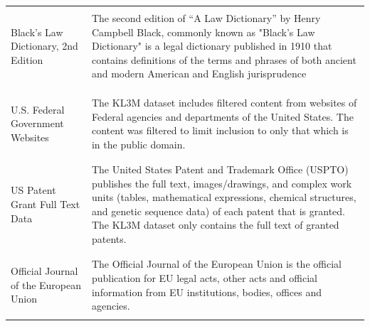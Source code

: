 \documentclass{article}
\begin{document}
\begin{appendices}
\begin{table}[!ht]
\begin{longtable}{ p{3cm} p{9cm} }
\\
 \\\hline
  \\
Black's Law Dictionary, 2nd Edition &
The second edition of ``A Law Dictionary'' by Henry Campbell Black, commonly known as "Black's Law Dictionary" is a legal dictionary published in 1910 that contains definitions of the terms and phrases of both ancient and modern American and English jurisprudence \\\\
 \\\hline  \\
U.S. Federal Government Websites &
The KL3M dataset includes filtered content from websites of Federal agencies and departments of the United States. The content was filtered to limit inclusion to only that which is in the public domain.  \\
 \\\hline
 \\
US Patent Grant Full Text Data &
The United States Patent and Trademark Office (USPTO) publishes the full text, images/drawings, and complex work units (tables, mathematical expressions, chemical structures, and genetic sequence data) of each patent that is granted. The KL3M dataset only contains the full text of granted patents.
  \\
 \\\hline 
 \\
 Official Journal of the European Union &
The Official Journal of the European Union is the official publication for EU legal acts, other acts and official information from EU institutions, bodies, offices and agencies. \\
 \\\hline
    \end{longtable}

\end{table}

\end{appendices}
\end{document}
